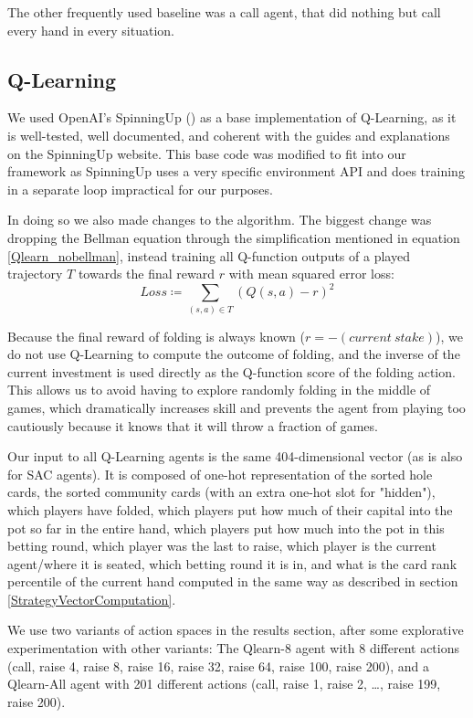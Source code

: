 The other frequently used baseline was a call agent, that did nothing but call every hand in every situation.

\subsection{Q-Learning}
We used OpenAI's SpinningUp (\cite{SpinningUp2018}) as a base implementation of Q-Learning, as it is well-tested, well documented, and coherent with the guides and explanations on the SpinningUp website. This base code was modified to fit into our framework as SpinningUp uses a very specific environment API and does training in a separate loop impractical for our purposes.

In doing so we also made changes to the algorithm. The biggest change was dropping the Bellman equation through the simplification mentioned in equation \ref{Qlearn_nobellman}, instead training all Q-function outputs of a played trajectory $T$ towards the final reward $r$ with mean squared error loss:
\begin{equation}
    Loss \coloneqq \sum_{(s, a) \in T} (Q(s, a) - r)^2
\end{equation}

Because the final reward of folding is always known ($r = -(current\ stake)$), we do not use Q-Learning to compute the outcome of folding, and the inverse of the current investment is used directly as the Q-function score of the folding action. This allows us to avoid having to explore randomly folding in the middle of games, which dramatically increases skill and prevents the agent from playing too cautiously because it knows that it will throw a fraction of games.

Our input to all Q-Learning agents is the same 404-dimensional vector (as is also for SAC agents). It is composed of one-hot representation of the sorted hole cards, the sorted community cards (with an extra one-hot slot for "hidden"), which players have folded, which players put how much of their capital into the pot so far in the entire hand, which players put how much into the pot in this betting round, which player was the last to raise, which player is the current agent/where it is seated, which betting round it is in, and what is the card rank percentile of the current hand computed in the same way as described in section \ref{StrategyVectorComputation}.

We use two variants of action spaces in the results section, after some explorative experimentation with other variants: The Qlearn-8 agent with 8 different actions (call, raise 4, raise 8, raise 16, raise 32, raise 64, raise 100, raise 200), and a Qlearn-All agent with 201 different actions (call, raise 1, raise 2, \dots, raise 199, raise 200).

